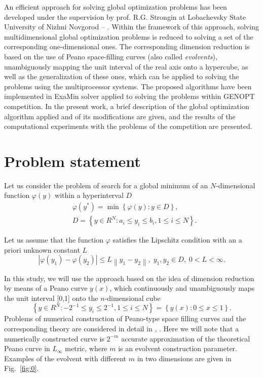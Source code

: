 \documentclass{llncs}
\begin{document}
An efficient approach for solving global optimization problems has been developed under the supervision by prof. R.G. Strongin at Lobachevsky State University of Nizhni Novgorod \cite{Sergeyev1994} -- \cite{Barkalov2016}. Within the framework of this approach, solving multidimensional global optimization problems is reduced to solving a set of the corresponding one-dimensional ones. The corresponding dimension reduction is based on the use of Peano space-filling curves (also called \textit{evolvents}), unambiguously mapping the unit interval of the real axis onto a hypercube, as well as the generalization of these ones, which can be applied to solving the problems using the multiprocessor systems. The proposed algorithms have been implemented in ExaMin solver applied to solving the problems within GENOPT competition. In the present work, a brief description of the global optimization algorithm applied and of its modifications are given, and the results of the computational experiments with the problems of the competition are presented.

\section{Problem statement}

Let us consider the problem of search for a global minimum of an $N$-dimensional function $\varphi(y)$ within a hyperinterval $D$
\begin{eqnarray}\label{eq:1}
& \varphi(y^\ast)=\min{\left\{\varphi(y):y\in D\right\}},\\
& D=\left\{y\in R^N: a_i\leq y_i \leq b_i, 1\leq i \leq N\right\}. \nonumber
\end{eqnarray}

Let us assume that the function $\varphi$ satisfies the Lipschitz condition with an a priori unknown constant $L$
\[
\left|\varphi(y_1)-\varphi(y_2)\right|\leq L\left\|y_1-y_2\right\|,\; y_1,y_2 \in D,\; 0<L<\infty.
\]

In this study, we will use the approach based on the idea of dimension reduction by means of a Peano curve $y(x)$, which continuously and unambiguously maps the unit interval [0,1] onto the $n$-dimensional cube
\[
\left\{y\in R^N: -2^{-1}\leq y_i \leq 2^{-1}, 1 \leq i \leq N\right\}=\left\{y(x):0\leq x \leq 1 \right\}.
\]
Problems of numerical construction of Peano-type space filling curves and the corresponding theory are considered in detail in \cite{Strongin2000}, \cite{Sergeyev2013}.  
Here we will note that a numerically constructed curve is $2^{-m}$ accurate approximation of the theoretical Peano curve in $L_\infty$ metric, where $m$ is an evolvent construction parameter. Examples of the evolvent with different $m$ in two dimensions are given in Fig.~\ref{fig:0}.
\end{document}
